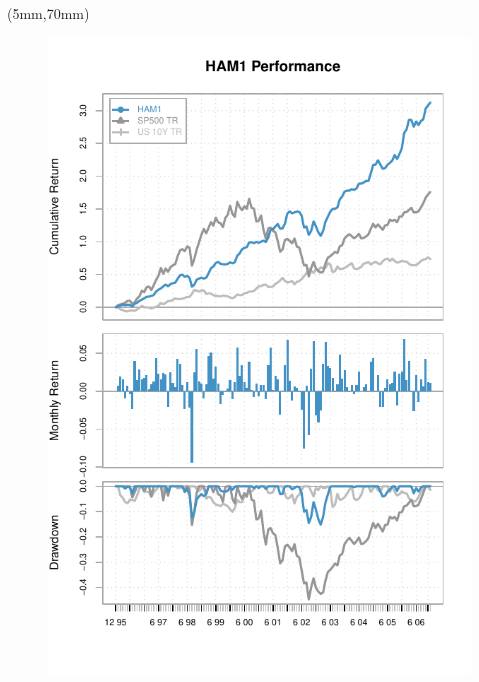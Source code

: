 \documentclass[nohyper,justified]{tufte-handout}
\begin{document}
\begin{textblock*}{150mm}(5mm,70mm)
\begin{figure}
\vspace{0pt}
\includegraphics{timelyPF_Report1-002}
\end{figure}
\end{textblock*}
 
\end{document}
